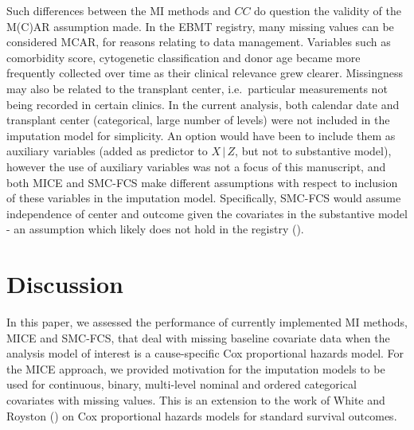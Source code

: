 \documentclass[
  letterpaper,
  paper=240mm:170mm,
  twoside=true,
  open=right,
  fontsize=10pt,
  pagesize=false,
  BCOR=15mm,
  DIV=14,
  headinclude=true,
  footinclude=false,
  headsepline=on]{scrbook}
\newcommand{\given}{\,|\,}
\begin{document}
Such differences between the MI methods and \(CC\) do question the
validity of the M(C)AR assumption made. In the EBMT registry, many
missing values can be considered MCAR, for reasons relating to data
management. Variables such as comorbidity score, cytogenetic
classification and donor age became more frequently collected over time
as their clinical relevance grew clearer. Missingness may also be
related to the transplant center, i.e.~particular measurements not being
recorded in certain clinics. In the current analysis, both calendar date
and transplant center (categorical, large number of levels) were not
included in the imputation model for simplicity. An option would have
been to include them as auxiliary variables (added as predictor to
\(X \given Z\), but not to substantive model), however the use of
auxiliary variables was not a focus of this manuscript, and both MICE
and SMC-FCS make different assumptions with respect to inclusion of
these variables in the imputation model. Specifically, SMC-FCS would
assume independence of center and outcome given the covariates in the
substantive model - an assumption which likely does not hold in the
registry ().

\section{Discussion}\label{sec-cs-MI-discussion}

In this paper, we assessed the performance of currently implemented MI
methods, MICE and SMC-FCS, that deal with missing baseline covariate
data when the analysis model of interest is a cause-specific Cox
proportional hazards model. For the MICE approach, we provided
motivation for the imputation models to be used for continuous, binary,
multi-level nominal and ordered categorical covariates with missing
values. This is an extension to the work of White and Royston
() on Cox
proportional hazards models for standard survival outcomes.
\end{document}
